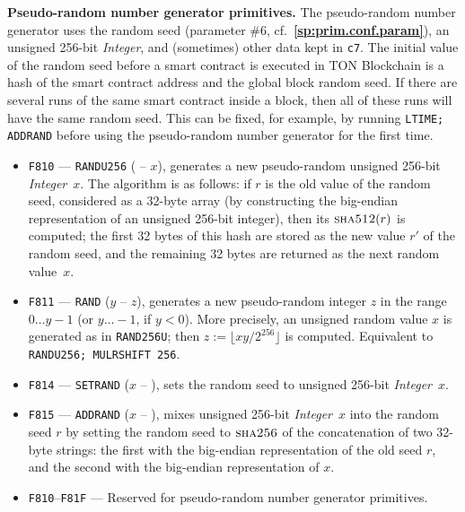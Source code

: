 \documentclass[12pt,oneside]{article}
\def\makepoint#1{\medbreak\noindent{\bf #1.\ }}
\def\nxsubpoint{\refstepcounter{subsubsection}%
  \smallbreak\makepoint{\thesubsubsection}}
\def\refpoint#1{{\rm\textbf{\ref{#1}}}}
\let\ptref=\refpoint
\def\emb#1{\textbf{#1.}}
\def\opsc#1{\operatorname{\textsc{#1}}}
\def\Sha{\opsc{sha256}}
\begin{document}
\nxsubpoint\emb{Pseudo-random number generator primitives}
The pseudo-random number generator uses the random seed (parameter \#6, cf.~\ptref{sp:prim.conf.param}), an unsigned 256-bit {\em Integer}, and (sometimes) other data kept in {\tt c7}. The initial value of the random seed before a smart contract is executed in TON Blockchain is a hash of the smart contract address and the global block random seed. If there are several runs of the same smart contract inside a block, then all of these runs will have the same random seed. This can be fixed, for example, by running {\tt LTIME; ADDRAND} before using the pseudo-random number generator for the first time.
\begin{itemize}
\item {\tt F810} --- {\tt RANDU256} ( -- $x$), generates a new pseudo-random unsigned 256-bit {\em Integer}~$x$. The algorithm is as follows: if $r$ is the old value of the random seed, considered as a 32-byte array (by constructing the big-endian representation of an unsigned 256-bit integer), then its $\opsc{sha512}(r)$ is computed; the first 32 bytes of this hash are stored as the new value $r'$ of the random seed, and the remaining 32 bytes are returned as the next random value~$x$.
\item {\tt F811} --- {\tt RAND} ($y$ -- $z$), generates a new pseudo-random integer $z$ in the range $0\ldots y-1$ (or $y\ldots-1$, if $y<0$). More precisely, an unsigned random value $x$ is generated as in {\tt RAND256U}; then $z:=\lfloor xy/2^{256}\rfloor$ is computed. Equivalent to {\tt RANDU256; MULRSHIFT 256}.
\item {\tt F814} --- {\tt SETRAND} ($x$ -- ), sets the random seed to unsigned 256-bit {\em Integer\/}~$x$.
\item {\tt F815} --- {\tt ADDRAND} ($x$ -- ), mixes unsigned 256-bit {\em Integer\/}~$x$ into the random seed $r$ by setting the random seed to $\Sha$ of the concatenation of two 32-byte strings: the first with the big-endian representation of the old seed $r$, and the second with the big-endian representation of $x$.
\item {\tt F810}--{\tt F81F} --- Reserved for pseudo-random number generator primitives.
\end{itemize}
\end{document}
